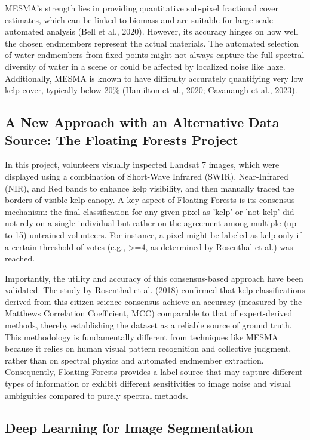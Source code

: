 \documentclass{article}
\begin{document}
MESMA's strength lies in providing quantitative sub-pixel fractional cover estimates, which can be linked to biomass and are suitable for large-scale automated analysis (Bell et al., 2020). However, its accuracy hinges on how well the chosen endmembers represent the actual materials. The automated selection of water endmembers from fixed points might not always capture the full spectral diversity of water in a scene or could be affected by localized noise like haze. Additionally, MESMA is known to have difficulty accurately quantifying very low kelp cover, typically below 20\% (Hamilton et al., 2020; Cavanaugh et al., 2023).

\subsection{A New Approach with an Alternative Data Source: The Floating Forests Project} 

In this project, volunteers visually inspected Landsat 7 images, which were displayed using a combination of Short-Wave Infrared (SWIR), Near-Infrared (NIR), and Red bands to enhance kelp visibility, and then manually traced the borders of visible kelp canopy. A key aspect of Floating Forests is its consensus mechanism: the final classification for any given pixel as 'kelp' or 'not kelp' did not rely on a single individual but rather on the agreement among multiple (up to 15) untrained volunteers. For instance, a pixel might be labeled as kelp only if a certain threshold of votes (e.g., >=4, as determined by Rosenthal et al.) was reached. 
       
Importantly, the utility and accuracy of this consensus-based approach have been validated. The study by Rosenthal et al. (2018) confirmed that kelp classifications derived from this citizen science consensus achieve an accuracy (measured by the Matthews Correlation Coefficient, MCC) comparable to that of expert-derived methods, thereby establishing the dataset as a reliable source of ground truth. This methodology is fundamentally different from techniques like MESMA because it relies on human visual pattern recognition and collective judgment, rather than on spectral physics and automated endmember extraction. Consequently, Floating Forests provides a label source that may capture different types of information or exhibit different sensitivities to image noise and visual ambiguities compared to purely spectral methods.

\subsection{Deep Learning for Image Segmentation} 
\end{document}
